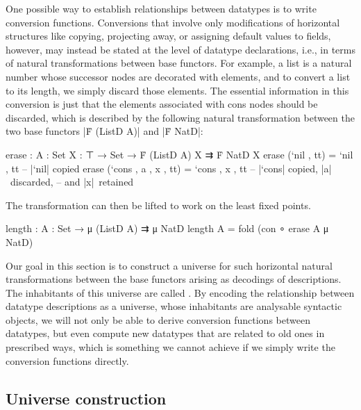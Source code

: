 One possible way to establish relationships between datatypes is to write conversion functions.
Conversions that involve only modifications of horizontal structures like copying, projecting away, or assigning default values to fields, however, may instead be stated at the level of datatype declarations, i.e., in terms of natural transformations between base functors.
For example, a list is a natural number whose successor nodes are decorated with elements, and to convert a list to its length, we simply discard those elements.
The essential information in this conversion is just that the elements associated with cons nodes should be discarded, which is described by the following natural transformation between the two base functors |Ḟ (ListD A)| and |Ḟ NatD|:
\begin{code}
erase : {A : Set} {X : ⊤ → Set} → Ḟ (ListD A) X ⇉ Ḟ NatD X
erase (`nil   ,          tt)  =  `nil   ,       tt  -- |`nil| copied
erase (`cons  , a , x ,  tt)  =  `cons  ,  x ,  tt   -- |`cons| copied, |a|~discarded,
                                                     -- and |x|~retained
\end{code}
The transformation can then be lifted to work on the least fixed points.
\begin{code}
length : {A : Set} → μ (ListD A) ⇉ μ NatD
length {A} = fold (con ∘ erase {A} {μ NatD})
\end{code}
Our goal in this section is to construct a universe for such horizontal natural transformations between the base functors arising as decodings of descriptions.
The inhabitants of this universe are called .
By encoding the relationship between datatype descriptions as a universe, whose inhabitants are analysable syntactic objects, we will not only be able to derive conversion functions between datatypes, but even compute new datatypes that are related to old ones in prescribed ways, which is something we cannot achieve if we simply write the conversion functions directly.

\subsection{Universe construction}

